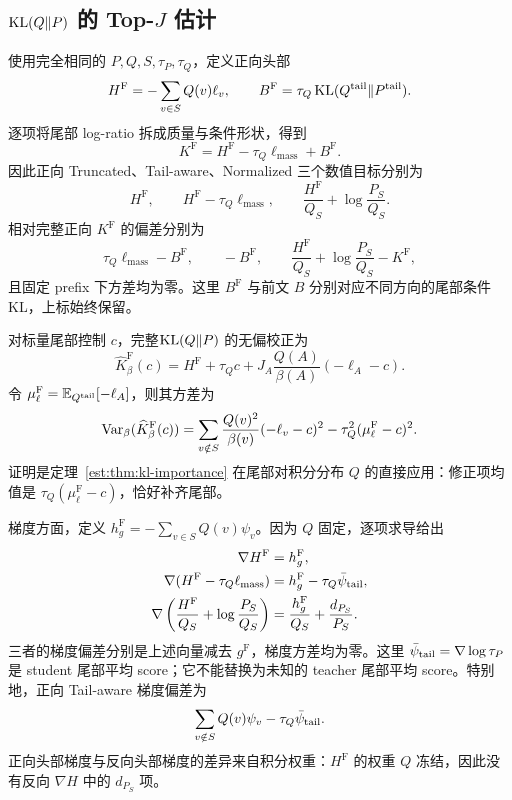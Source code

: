 \subsection{$\operatorname{KL}(Q\Vert P)$ 的 Top-$J$ 估计}

使用完全相同的 $P,Q,S,\tau_P,\tau_Q$，定义正向头部
\begin{equation*}
 H^{\mathrm F}=-\sum_{v\in S}Q(v)\ell_v,\qquad
 B^{\mathrm F}=\tau_Q\operatorname{KL}(Q^{\mathrm{tail}}\Vert P^{\mathrm{tail}}).
\end{equation*}
逐项将尾部 log-ratio 拆成质量与条件形状，得到
\begin{equation*}
 K^{\mathrm F}=H^{\mathrm F}-\tau_Q\ell_{\mathrm{mass}}+B^{\mathrm F}.
\end{equation*}
因此正向 Truncated、Tail-aware、Normalized 三个数值目标分别为
\begin{equation*}
 H^{\mathrm F},\qquad
 H^{\mathrm F}-\tau_Q\ell_{\mathrm{mass}},\qquad
 \frac{H^{\mathrm F}}{Q_S}+\log\frac{P_S}{Q_S}.
\end{equation*}
相对完整正向 $K^{\mathrm F}$ 的偏差分别为
\begin{equation*}
 \tau_Q\ell_{\mathrm{mass}}-B^{\mathrm F},\qquad
 -B^{\mathrm F},\qquad
 \frac{H^{\mathrm F}}{Q_S}+\log\frac{P_S}{Q_S}-K^{\mathrm F},
\end{equation*}
且固定 prefix 下方差均为零。这里 $B^{\mathrm F}$ 与前文 $B$ 分别对应不同方向的尾部条件 KL，上标始终保留。

对标量尾部控制 $c$，完整$\operatorname{KL}(Q\Vert P)$ 的无偏校正为
\begin{equation*}
 \widehat K^{\mathrm F}_\beta(c)
 =H^{\mathrm F}+\tau_Qc
   +J_A\frac{Q(A)}{\beta(A)}(-\ell_A-c).
\end{equation*}
令 $\mu_\ell^{\mathrm F}=\mathbb E_{Q^{\mathrm{tail}}}[-\ell_A]$，则其方差为
\begin{equation*}
 \operatorname{Var}_\beta(\widehat K^{\mathrm F}_\beta(c))
 =\sum_{v\notin S}\frac{Q(v)^2}{\beta(v)}(-\ell_v-c)^2
   -\tau_Q^2(\mu_\ell^{\mathrm F}-c)^2.
\end{equation*}
证明是定理~\ref{est:thm:kl-importance} 在尾部对积分分布 $Q$ 的直接应用：修正项均值是 $\tau_Q(\mu_\ell^{\mathrm F}-c)$，恰好补齐尾部。

梯度方面，定义 $h_g^{\mathrm F}=-\sum_{v\in S}Q(v)\psi_v$。因为 $Q$ 固定，逐项求导给出
\begin{align*}
 \nabla H^{\mathrm F}&=h_g^{\mathrm F},\\
 \nabla(H^{\mathrm F}-\tau_Q\ell_{\mathrm{mass}})
 &=h_g^{\mathrm F}-\tau_Q\bar\psi_{\mathrm{tail}},\\
 \nabla\left(\frac{H^{\mathrm F}}{Q_S}+\log\frac{P_S}{Q_S}\right)
 &=\frac{h_g^{\mathrm F}}{Q_S}+\frac{d_{P_S}}{P_S}.
\end{align*}
三者的梯度偏差分别是上述向量减去 $g^{\mathrm F}$，梯度方差均为零。这里 $\bar\psi_{\mathrm{tail}}=\nabla\log\tau_P$ 是 student 尾部平均 score；它不能替换为未知的 teacher 尾部平均 score。特别地，正向 Tail-aware 梯度偏差为
\begin{equation*}
 \sum_{v\notin S}Q(v)\psi_v-\tau_Q\bar\psi_{\mathrm{tail}}.
\end{equation*}
正向头部梯度与反向头部梯度的差异来自积分权重：$H^{\mathrm F}$ 的权重 $Q$ 冻结，因此没有反向 $\nabla H$ 中的 $d_{P_S}$ 项。

